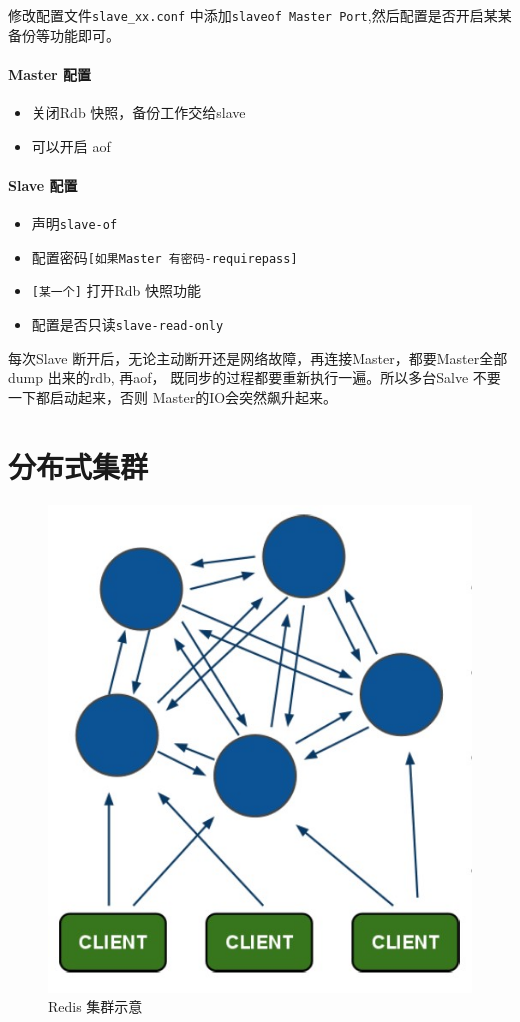 \documentclass[UTF8,a4paper,12pt]{ctexbook}
\begin{document}
		修改配置文件\verb|slave_xx.conf| 中添加\verb|slaveof Master Port|,然后配置是否开启某某备份等功能即可。
		
		\paragraph{Master 配置}
			\begin{itemize}
				\item 关闭Rdb 快照，备份工作交给slave
				\item 可以开启 aof 
			\end{itemize}
		
		\paragraph{Slave 配置}
			\begin{itemize}
				\item 声明\verb|slave-of|
				\item 配置密码\verb|[如果Master 有密码-requirepass]|
				\item \verb|[某一个]| 打开Rdb 快照功能
				\item 配置是否只读\verb|slave-read-only|
			\end{itemize}
		
		
		每次Slave 断开后，无论主动断开还是网络故障，再连接Master，都要Master全部dump 出来的rdb, 再aof， 既同步的过程都要重新执行一遍。所以多台Salve 不要一下都启动起来，否则 Master的IO会突然飙升起来。	
	\section{分布式集群}
		 \begin{figure}[H]
				\centering
				\includegraphics[scale=0.5]{cluster}
				\caption{Redis 集群示意}
		 \end{figure}
		 
\end{document}
